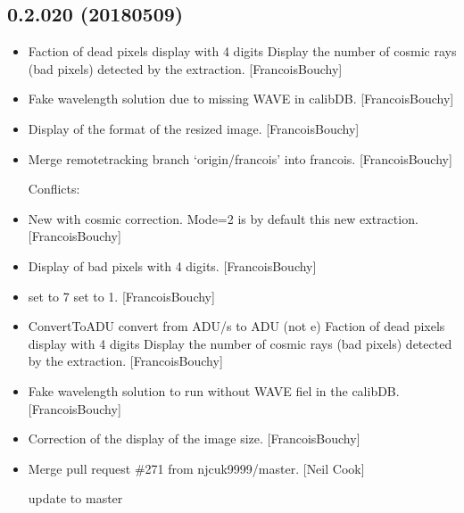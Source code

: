 \documentclass[a4paper,10pt,english]{report}
\begin{document}
\subsection{0.2.020 (2018\sphinxhyphen{}05\sphinxhyphen{}09)}
\label{\detokenize{misc/changelog:id460}}\begin{itemize}
\item {} 
Faction of dead pixels display with 4 digits Display the number of
cosmic rays (bad pixels) detected by the extraction. {[}FrancoisBouchy{]}

\item {} 
Fake wavelength solution due to missing WAVE in calibDB.
{[}FrancoisBouchy{]}

\item {} 
Display of the format of the resized image. {[}FrancoisBouchy{]}

\item {} 
Merge remote\sphinxhyphen{}tracking branch ‘origin/francois’ into francois.
{[}FrancoisBouchy{]}
\begin{description}
\item[{Conflicts:}] \leavevmode
{}

\end{description}

\item {} 
New  with cosmic correction. Mode=2 is by
default this new extraction. {[}FrancoisBouchy{]}

\item {} 
Display of bad pixels with 4 digits. {[}FrancoisBouchy{]}

\item {} 
 set to 7  set to \sphinxhyphen{}1. {[}FrancoisBouchy{]}

\item {} 
ConvertToADU convert from ADU/s to ADU (not e\sphinxhyphen{}) Faction of dead pixels
display with 4 digits Display the number of cosmic rays (bad pixels)
detected by the extraction. {[}FrancoisBouchy{]}

\item {} 
Fake wavelength solution to run without WAVE fiel in the calibDB.
{[}FrancoisBouchy{]}

\item {} 
Correction of the display of the image size. {[}FrancoisBouchy{]}

\item {} 
Merge pull request \#271 from njcuk9999/master. {[}Neil Cook{]}

update to master

\end{itemize}
\end{document}
